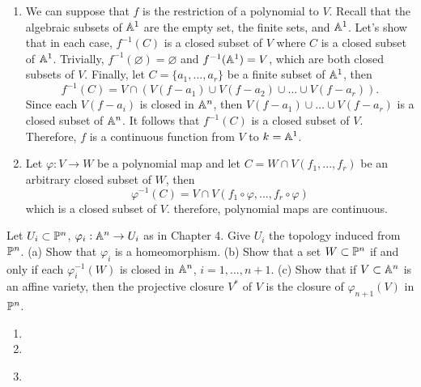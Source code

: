 \begin{solution}
    \begin{enumerate}
        \item We can suppose that $f$ is the restriction of a polynomial to $V$. Recall that the algebraic subsets of $\A^1$ are the empty set, the finite sets, and $\A^1$. Let's show that in each case, $f^{-1}(C)$ is a closed subset of $V$ where $C$ is a closed subset of $\A^1$. Trivially, $f^{-1}(\varnothing) = \varnothing$ and $f^{-1}(\A^1) = V$, which are both closed subsets of $V$. Finally, let $C = \{a_1, ..., a_r\}$ be a finite subset of $\A^1$, then
        $$f^{-1}(C) = V\cap (V(f - a_1) \cup V(f- a_2) \cup ... \cup V(f-a_r)).$$
        Since each $V(f-a_i)$ is closed in $\A^n$, then $V(f - a_1) \cup ... \cup V(f-a_r)$ is a closed subset of $\A^n$. It follows that $f^{-1}(C)$ is a closed subset of $V$. Therefore, $f$ is a continuous function from $V$ to $k = \A^1$.
        \item Let $\varphi : V \to W$ be a polynomial map and let $C = W \cap V(f_1, ..., f_r)$ be an arbitrary closed subset of $W$, then
        $$\varphi^{-1}(C) = V \cap V(f_1 \circ \varphi, ..., f_r \circ \varphi)$$
        which is a closed subset of $V$. therefore, polynomial maps are continuous.\\
    \end{enumerate}
\end{solution}

\begin{exercise}
    Let $U_i \subset \P^n$, $\varphi_i : \A^n \to U_i$ as in Chapter 4. Give $U_i$ the topology induced from $\P^n$. (a) Show that $\varphi_i$ is a homeomorphism. (b) Show that a set $W \subset \P^n$ if and only if each $\varphi_i^{-1}(W)$ is closed in $\A^n$, $i=1,...,n+1$. (c) Show that if $V \subset \A^n$ is an affine variety, then the projective closure $V^*$ of $V$ is the closure of $\varphi_{n+1}(V)$ in $\P^n$. \\
\end{exercise}

\begin{solution}
    \begin{enumerate}
        \item \td
        \item \td
        \item \td \\
    \end{enumerate}
\end{solution}

\begin{exercise}
    \td \\
\end{exercise}

